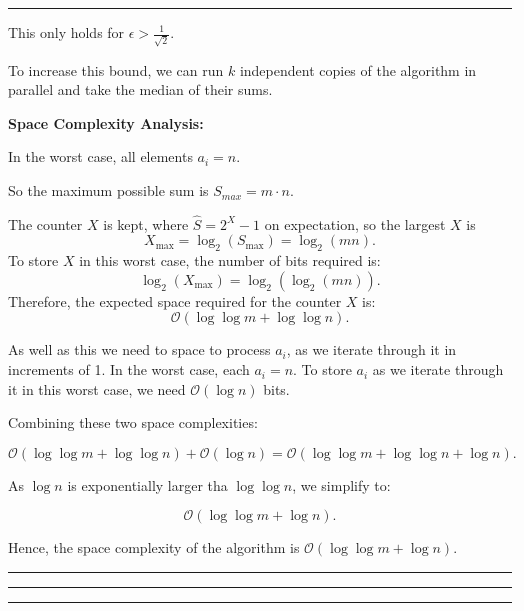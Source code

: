 \documentclass[11pt, english]{article}
\newenvironment{answer}{%
  \par\noindent\hrule %
  \vspace{0.25\baselineskip}%
  \noindent{\Large\bfseries Answer}\par\vspace{0.25\baselineskip}\noindent\ignorespaces
}{%
  \par\vspace{0.5\baselineskip}%
  \noindent\hrule\vspace{0.5\baselineskip}%
  \hrule\hrule
}
\begin{document}
\begin{answer}
This only holds for $\epsilon > \frac{1}{\sqrt{2}}$.

To increase this bound, we can run $k$ independent copies of the algorithm in parallel and take the median of their sums.

\bigskip

\textbf{Space Complexity Analysis:}

In the worst case, all elements $a_i = n$.

So the maximum possible sum is $S_{max} = m \cdot n$.

The counter $X$ is kept, where $\hat{S} = 2^X - 1$ on expectation, so the largest $X$ is
\[
X_{\max} = \log_2(S_{\max}) = \log_2(m n).
\]
To store $X$ in this worst case, the number of bits required is:
\[
\log_2(X_{\max}) = \log_2(\log_2(m n)).
\]
Therefore, the expected space required for the counter $X$ is:
\[
\mathcal{O}\left(\log \log m + \log \log n\right).
\]


As well as this we need to space to process $a_i$, as we iterate through it in increments of 1.
In the worst case, each $a_i = n$.
To store $a_i$ as we iterate through it in this worst case, we need $\mathcal{O}(\log n)$ bits.

Combining these two space complexities:

\[
\mathcal{O}\left(\log \log m + \log \log n\right) + \mathcal{O}(\log n) = \mathcal{O}\left(\log \log m + \log \log n + \log n\right).
\]

As $\log n$ is exponentially larger tha $\log \log n$, we simplify to:

\[
\mathcal{O}\left(\log\log m + \log n\right).
\]

Hence, the space complexity of the algorithm is $\mathcal{O}\left(\log\log m + \log n\right)$.

\end{answer}
\end{document}
